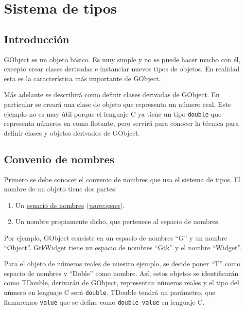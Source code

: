 %

\section{Sistema de tipos}
\subsection{Introducción}
\textsf{GObject} es un objeto básico. Es muy simple y no se puede hacer mucho con él, excepto crear
clases derivadas e instanciar nuevos tipos de objetos.
En realidad esta es la característica más importante de \textsf{GObject}.

Más adelante se describirá como definir clases derivadas de \textsf{GObject}.
En particular se creará una clase de objeto  que representa un número real.
Este ejemplo no es muy útil porque el lenguaje C ya tiene un tipo \texttt{double} que representa
números en coma flotante, pero servirá para conocer la técnica para definir clases y objetos derivados de \textsf{GObject}.

\subsection{Convenio de nombres}
Primero se debe conocer el convenio de nombres que usa el sistema de tipos.
El nombre de un objeto tiene dos partes:
\begin{enumerate}
  \tightlist
\item Un \href{https://es.wikipedia.org/wiki/Espacio_de_nombres}{espacio de nombres}
  (\href{https://en.wikipedia.org/wiki/Namespace}{\textit{namespace}}).
\item Un nombre propiamente dicho, que pertenece al espacio de nombres.
\end{enumerate}

Por ejemplo, \textsf{GObject} consiste en un espacio de nombres ``\textsf{G}'' y un nombre ``\textsf{Object}''.
\textsf{GtkWidget} tiene un espacio de nombres ``\textsf{Gtk}'' y el nombre ``\textsf{Widget}''.

Para el objeto de números reales de nuestro ejemplo, se decide poner ``\textsf{T}'' como espacio
de nombres y ``\textsf{Doble}'' como nombre. Así, estos objetos se identificarán como \textsf{TDouble},
derivarán de \textsf{GObject}, representan números reales y el tipo del número en
lenguaje C será \texttt{double}. \textsf{TDouble} tendrá un parámetro, que llamaremos
\texttt{value} que se  define como \texttt{double value} en lenguaje C.


